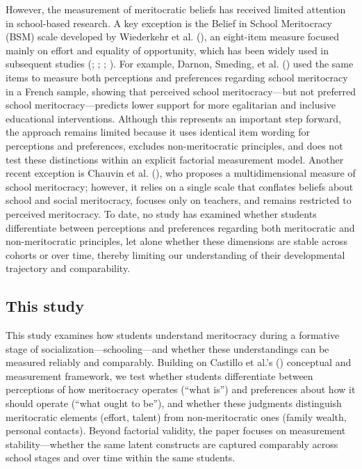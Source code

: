 \documentclass[
  13pt,
]{article}
\begin{document}
However, the measurement of meritocratic beliefs has received limited
attention in school-based research. A key exception is the Belief in
School Meritocracy (BSM) scale developed by Wiederkehr et al.
(), an eight-item measure
focused mainly on effort and equality of opportunity, which has been
widely used in subsequent studies
(;
;
;
). For
example, Darnon, Smeding, et al.
() used the same items to measure
both perceptions and preferences regarding school meritocracy in a
French sample, showing that perceived school meritocracy---but not
preferred school meritocracy---predicts lower support for more
egalitarian and inclusive educational interventions. Although this
represents an important step forward, the approach remains limited
because it uses identical item wording for perceptions and preferences,
excludes non-meritocratic principles, and does not test these
distinctions within an explicit factorial measurement model. Another
recent exception is Chauvin et al.
(), who proposes a
multidimensional measure of school meritocracy; however, it relies on a
single scale that conflates beliefs about school and social meritocracy,
focuses only on teachers, and remains restricted to perceived
meritocracy. To date, no study has examined whether students
differentiate between perceptions and preferences regarding both
meritocratic and non-meritocratic principles, let alone whether these
dimensions are stable across cohorts or over time, thereby limiting our
understanding of their developmental trajectory and comparability.

\subsection{This study}\label{this-study}

This study examines how students understand meritocracy during a
formative stage of socialization---schooling---and whether these
understandings can be measured reliably and comparably. Building on
Castillo et al.'s ()
conceptual and measurement framework, we test whether students
differentiate between perceptions of how meritocracy operates (``what
is'') and preferences about how it should operate (``what ought to
be''), and whether these judgments distinguish meritocratic elements
(effort, talent) from non-meritocratic ones (family wealth, personal
contacts). Beyond factorial validity, the paper focuses on measurement
stability---whether the same latent constructs are captured comparably
across school stages and over time within the same students.
\end{document}
